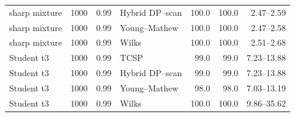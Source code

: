 \begin{longtable}{@{}p{}rrp{}rrr@{}}
sharp mixture & 1000 & 0.99 & Hybrid DP--scan & 100.0 & 100.0 & 2.47--2.59 \\
sharp mixture & 1000 & 0.99 & Young--Mathew & 100.0 & 100.0 & 2.47--2.58 \\
sharp mixture & 1000 & 0.99 & Wilks & 100.0 & 100.0 & 2.51--2.68 \\
Student t3 & 1000 & 0.99 & TCSP & 99.0 & 99.0 & 7.23--13.88 \\
Student t3 & 1000 & 0.99 & Hybrid DP--scan & 99.0 & 99.0 & 7.23--13.88 \\
Student t3 & 1000 & 0.99 & Young--Mathew & 98.0 & 98.0 & 7.03--13.19 \\
Student t3 & 1000 & 0.99 & Wilks & 100.0 & 100.0 & 9.86--35.62 \\
\bottomrule
\end{longtable}
\endgroup
